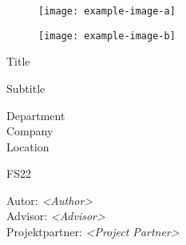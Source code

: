 \begin{titlepage}
    \begin{figure}[!tbp]
        \centering
        \begin{minipage}[b]{0.4\textwidth}
            \texttt{[image: example-image-a]}
        \end{minipage}
        \hfill
        \begin{minipage}[b]{0.4\textwidth}
            \texttt{[image: example-image-b]}
        \end{minipage}\label{fig:figure}
    \end{figure}
    \noindent
    \parbox[t]{\textwidth}{
        \vspace{0.5cm}
        \centering
        \fontsize{35pt}{35pt}\selectfont
        Title
        \vspace{0.5cm}
    }
    \parbox[t]{\textwidth}{
        \vspace{2cm}
        \centering
        \fontsize{35pt}{35pt}\selectfont
        Subtitle
    }
    \noindent
    \parbox[t]{\textwidth}{
        \vspace{1cm}
        \centering
        \Large
        Department\\
        Company\\
        Location
    }

    \vspace{2cm}
    \noindent
    \parbox[t]{\textwidth}{
        \vspace{0.2cm}
        \centering
        \Large
        FS22
        \vspace{0.2cm}
    }

        \noindent
        \parbox[c]{\textwidth}{
            \vspace{3cm}
            {\large Autor:        \hspace{21mm} \textit{<Author>}}\\[\baselineskip]
            {\large Advisor:       \hspace{16mm} \textit{<Advisor>}}\\[\baselineskip]
            {\large Projektpartner: \hspace{3.5mm} \textit{<Project Partner>}} \\[\baselineskip]
        }
    
\end{titlepage}
\restoregeometry %
\nopagecolor%